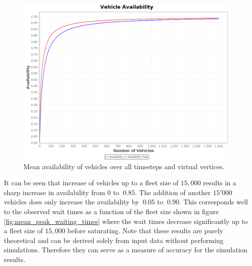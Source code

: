 \begin{figure}[h]
\begin{center}\includegraphics[width=1.0\textwidth]{figures/availbilitiesByNumberVehicles.png}\end{center}
\caption{Mean availability of vehicles over all timesteps and virtual vertices. }
\label{fig:performanceavailability}
\end{figure}

It can be seen that increase of vehicles up to a fleet size of $15,000$ results in a sharp increase in availability from $0$ to $~0.85$. The addition of another $15'000$ vehicles does only increase the availability by $~0.05$ to $~0.90$. This corresponds well to the observed wait times as a function of the fleet size shown in figure \ref{fig:mean_peak_waiting_times} where the wait times decrease significantly up to a fleet size of $15,000$ before saturating. Note that these results are purely theoretical and can be derived solely from input data without performing simulations. Therefore they can serve as a measure of accuracy for the simulation results.